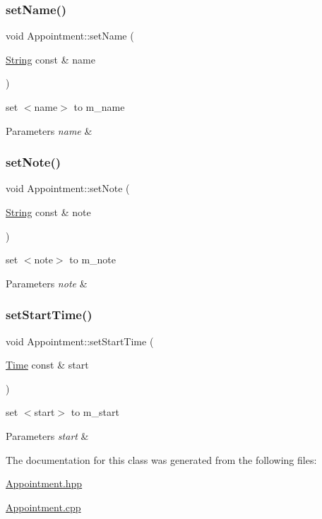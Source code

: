 \subsubsection{\texorpdfstring{set\+Name()}{setName()}}
{\footnotesize\ttfamily void Appointment\+::set\+Name (\begin{DoxyParamCaption}\item[{\hyperlink{classString}{String} const \&}]{name }\end{DoxyParamCaption})}

set $<$name$>$ to m\+\_\+name 
\begin{DoxyParams}{Parameters}
{\em name} & \\
\hline
\end{DoxyParams}
\mbox{\label{classAppointment_a367bc61167a71691ba150808968f3b8c}} 
\subsubsection{\texorpdfstring{set\+Note()}{setNote()}}
{\footnotesize\ttfamily void Appointment\+::set\+Note (\begin{DoxyParamCaption}\item[{\hyperlink{classString}{String} const \&}]{note }\end{DoxyParamCaption})}

set $<$note$>$ to m\+\_\+note 
\begin{DoxyParams}{Parameters}
{\em note} & \\
\hline
\end{DoxyParams}
\mbox{\label{classAppointment_ae0e33915a3e3d3af95c7e6180809e5fe}} 
\subsubsection{\texorpdfstring{set\+Start\+Time()}{setStartTime()}}
{\footnotesize\ttfamily void Appointment\+::set\+Start\+Time (\begin{DoxyParamCaption}\item[{\hyperlink{classTime}{Time} const \&}]{start }\end{DoxyParamCaption})}

set $<$start$>$ to m\+\_\+start 
\begin{DoxyParams}{Parameters}
{\em start} & \\
\hline
\end{DoxyParams}


The documentation for this class was generated from the following files\+:\begin{DoxyCompactItemize}
\item 
\hyperlink{Appointment_8hpp}{Appointment.\+hpp}\item 
\hyperlink{Appointment_8cpp}{Appointment.\+cpp}\end{DoxyCompactItemize}
